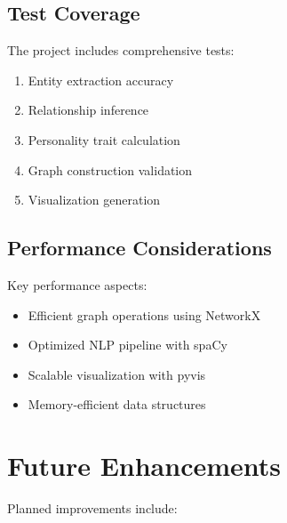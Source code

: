 \documentclass[11pt]{article}
\begin{document}
\subsection{Test Coverage}
The project includes comprehensive tests:

\begin{enumerate}
    \item Entity extraction accuracy
    \item Relationship inference
    \item Personality trait calculation
    \item Graph construction validation
    \item Visualization generation
\end{enumerate}

\subsection{Performance Considerations}
Key performance aspects:

\begin{itemize}
    \item Efficient graph operations using NetworkX
    \item Optimized NLP pipeline with spaCy
    \item Scalable visualization with pyvis
    \item Memory-efficient data structures
\end{itemize}

\section{Future Enhancements}
Planned improvements include:
\end{document}
